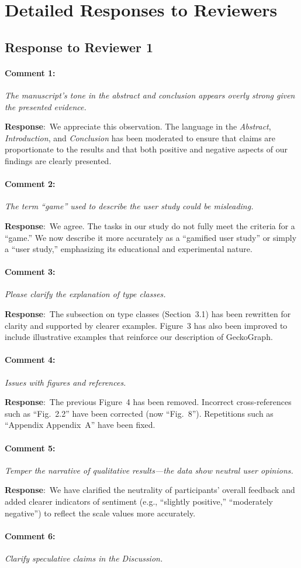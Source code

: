 \documentclass{article}
\newcommand{\pointRaised}[2]{\medskip \noindent 
               \paragraph{#1} \textsl{#2}}
\newcommand{\reply}{\noindent \textbf{Response}:\ }
\begin{document}
\section{Detailed Responses to Reviewers}

\subsection*{Response to Reviewer 1}

\pointRaised{Comment 1:}{The manuscript’s tone in the abstract and conclusion appears overly strong given the presented evidence.}

\reply We appreciate this observation. The language in the \textit{Abstract}, \textit{Introduction}, and \textit{Conclusion} has been moderated to ensure that claims are proportionate to the results and that both positive and negative aspects of our findings are clearly presented.

\pointRaised{Comment 2:}{The term “game” used to describe the user study could be misleading.}

\reply We agree. The tasks in our study do not fully meet the criteria for a “game.” We now describe it more accurately as a “gamified user study” or simply a “user study,” emphasizing its educational and experimental nature.

\pointRaised{Comment 3:}{Please clarify the explanation of type classes.}

\reply The subsection on type classes (Section~3.1) has been rewritten for clarity and supported by clearer examples. Figure~3 has also been improved to include illustrative examples that reinforce our description of GeckoGraph.

\pointRaised{Comment 4:}{Issues with figures and references.}

\reply The previous Figure~4 has been removed. Incorrect cross-references such as “Fig.~2.2” have been corrected (now “Fig.~8”). Repetitions such as “Appendix Appendix~A” have been fixed.

\pointRaised{Comment 5:}{Temper the narrative of qualitative results—the data show neutral user opinions.}

\reply We have clarified the neutrality of participants’ overall feedback and added clearer indicators of sentiment (e.g., “slightly positive,” “moderately negative”) to reflect the scale values more accurately.

\pointRaised{Comment 6:}{Clarify speculative claims in the Discussion.}
\end{document}
